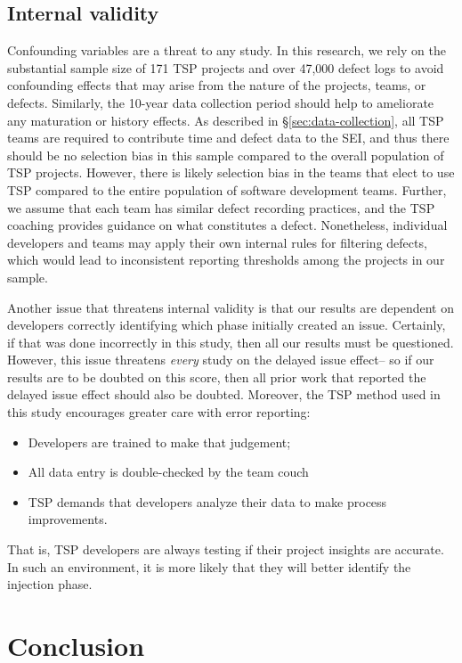 \documentclass[smallcondesed]{svjour3}
\newcommand{\bi}{\begin{itemize}}%
\newcommand{\ei}{\end{itemize}}
\begin{document}
\subsection{Internal validity}
Confounding variables are a threat to any study. In this research, we rely on the substantial sample size of 171 TSP projects and over 47,000 defect logs to avoid confounding effects that may arise from the nature of the projects, teams, or defects. Similarly, the 10-year data collection period should help to ameliorate any maturation or history effects.  As described in \S\ref{sec:data-collection}, all TSP teams are required to contribute time and defect data to the SEI, and thus there should be no selection bias in this sample compared to the overall population of TSP projects. However, there is likely selection bias in the teams that elect to use TSP compared to the entire population of software development teams. Further, we assume that each team has similar defect recording practices, and the TSP coaching provides guidance on what constitutes a defect. Nonetheless, individual developers and teams may apply their own internal rules for filtering defects, which would lead to inconsistent reporting thresholds among the projects in our sample.

Another issue that threatens internal validity is that our
results are dependent on developers correctly identifying which
phase initially created an issue. Certainly, if that was done
incorrectly in this study, then all our results must be questioned.
However,  this issue threatens {\em every} study on the delayed
issue effect-- so if our results are to be doubted on this score,
then all prior work that reported the delayed issue effect should
also be doubted. Moreover, the TSP method used in this study
encourages greater care with error reporting:


\bi
\item Developers are trained   to make that judgement;
\item All data entry is double-checked by the team couch 
\item TSP demands that developers analyze their data to make
process improvements. 
\ei
That is, TSP developers are always testing
if their project insights are accurate. In such an environment,
it is more likely that they will better identify the injection phase.
 
 
 \section{Conclusion}
  
\end{document}
